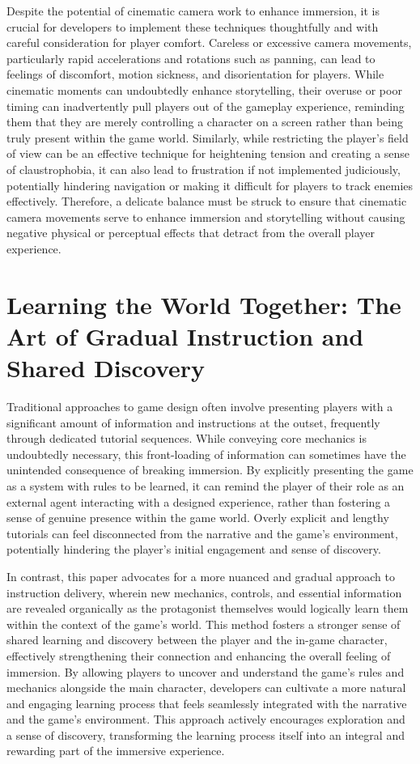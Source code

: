 \documentclass{article}
\begin{document}
    Despite the potential of cinematic camera work to enhance immersion, it is crucial for developers to implement these techniques thoughtfully and with careful consideration for player comfort. Careless or excessive camera movements, particularly rapid accelerations and rotations such as panning, can lead to feelings of discomfort, motion sickness, and disorientation for players. While cinematic moments can undoubtedly enhance storytelling, their overuse or poor timing can inadvertently pull players out of the gameplay experience, reminding them that they are merely controlling a character on a screen rather than being truly present within the game world. Similarly, while restricting the player's field of view can be an effective technique for heightening tension and creating a sense of claustrophobia, it can also lead to frustration if not implemented judiciously, potentially hindering navigation or making it difficult for players to track enemies effectively. Therefore, a delicate balance must be struck to ensure that cinematic camera movements serve to enhance immersion and storytelling without causing negative physical or perceptual effects that detract from the overall player experience.

    \section{Learning the World Together: The Art of Gradual Instruction and Shared Discovery}

    Traditional approaches to game design often involve presenting players with a significant amount of information and instructions at the outset, frequently through dedicated tutorial sequences. While conveying core mechanics is undoubtedly necessary, this front-loading of information can sometimes have the unintended consequence of breaking immersion. By explicitly presenting the game as a system with rules to be learned, it can remind the player of their role as an external agent interacting with a designed experience, rather than fostering a sense of genuine presence within the game world. Overly explicit and lengthy tutorials can feel disconnected from the narrative and the game's environment, potentially hindering the player's initial engagement and sense of discovery.

    In contrast, this paper advocates for a more nuanced and gradual approach to instruction delivery, wherein new mechanics, controls, and essential information are revealed organically as the protagonist themselves would logically learn them within the context of the game's world. This method fosters a stronger sense of shared learning and discovery between the player and the in-game character, effectively strengthening their connection and enhancing the overall feeling of immersion. By allowing players to uncover and understand the game's rules and mechanics alongside the main character, developers can cultivate a more natural and engaging learning process that feels seamlessly integrated with the narrative and the game's environment. This approach actively encourages exploration and a sense of discovery, transforming the learning process itself into an integral and rewarding part of the immersive experience.
\end{document}
